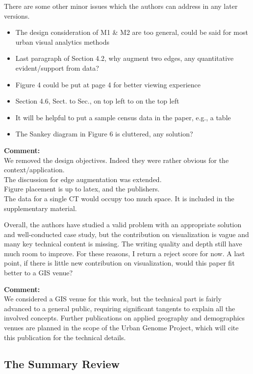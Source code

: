 \documentclass{article}
\newcommand{\reply}[1]{\begin{tcolorbox}\noindent\textbf{Comment:}\\#1\hfill\end{tcolorbox}}
\begin{document}
\begin{itemize}
{    There are some other minor issues which the authors can address in any later
    versions.

    \begin{itemize}
        \item{The design consideration of M1 \& M2 are too general, could be
        said for most urban visual analytics methods}
        \item{Last paragraph of Section 4.2, why augment two edges, any quantitative
        evident/support from data?}
        \item{Figure 4 could be put at page 4 for better viewing experience}
        \item{Section 4.6, Sect. to Sec., on top left to on the top left}
        \item{It will be helpful to put a sample census data in the paper, e.g., a table}
        \item{The Sankey diagram in Figure 6 is cluttered, any solution?}
    \end{itemize}
    \reply{We removed the design objectives. Indeed they were rather obvious for
    the context/application. \\
    The discussion for edge augmentation was extended.\\
    Figure placement is up to latex, and the publishers.\\
    The data for a single CT would occupy too much space. It is included in the
    supplementary material.}

    Overall, the authors have studied a valid problem with an appropriate
    solution and well-conducted case study, but the contribution on
    visualization is vague and many key technical content is missing. The
    writing quality and depth still have much room to improve. For these
    reasons, I return a reject score for now. A last point, if there is little
    new contribution on visualization, would this paper fit better to a GIS
    venue? 
    
    \reply{We considered a GIS venue for this work, but the technical part is
    fairly advanced to a general public, requiring significant tangents to
    explain all the involved concepts. Further publications on applied geography
    and demographics venues are planned in the scope of the Urban Genome
    Project, which will cite this publication for the technical details.}}
\end{itemize}

\subsection{The Summary Review}
\end{document}
